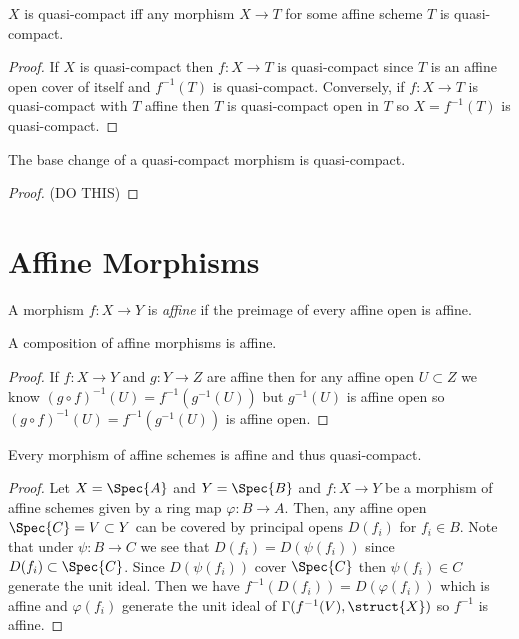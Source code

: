 \documentclass[12pt]{article}
\begin{document}
\begin{proposition}
$X$ is quasi-compact iff any morphism $X \to T$ for some affine scheme $T$ is quasi-compact.
\end{proposition}

\begin{proof}
If $X$ is quasi-compact then $f : X \to T$ is quasi-compact since $T$ is an affine open cover of itself and $f^{-1}(T)$ is quasi-compact. Conversely, if $f : X \to T$ is quasi-compact with $T$ affine then $T$ is quasi-compact open in $T$ so $X = f^{-1}(T)$ is quasi-compact.
\end{proof}

\begin{lemma}
The base change of a quasi-compact morphism is quasi-compact.
\end{lemma}

\begin{proof}
(DO THIS)
\end{proof}

\section{Affine Morphisms}

\begin{defn}
A morphism $f : X \to Y$ is \textit{affine} if the preimage of every affine open is affine.
\end{defn}

\begin{lemma}
A composition of affine morphisms is affine.
\end{lemma}

\begin{proof}
If $f : X \to Y$ and $g : Y \to Z$ are affine then for any affine open $U \subset Z$ we know $(g \circ f)^{-1}(U) = f^{-1}(g^{-1}(U))$ but $g^{-1}(U)$ is affine open so $(g \circ f)^{-1}(U) = f^{-1}(g^{-1}(U))$ is affine open.
\end{proof}

\begin{lemma}
Every morphism of affine schemes is affine and thus quasi-compact.
\end{lemma}

\begin{proof}
Let $X = \Spec{A}$ and $Y = \Spec{B}$ and $f : X \to Y$ be a morphism of affine schemes given by a ring map $\varphi : B \to A$. Then, any affine open $\Spec{C} = V \subset Y$ can be covered by principal opens $D(f_i)$ for $f_i \in B$. Note that under $\psi : B \to C$ we see that $D(f_i) = D(\psi(f_i))$ since $D(f_i) \subset \Spec{C}$. Since $D(\psi(f_i))$ cover $\Spec{C}$ then $\psi(f_i) \in C$ generate the unit ideal. Then we have $f^{-1}(D(f_i)) = D(\varphi(f_i))$ which is affine and $\varphi(f_i)$ generate the unit ideal of $\Gamma(f^{-1}(V), \struct{X})$ so $f^{-1}$ is affine.
\end{proof}
\end{document}
